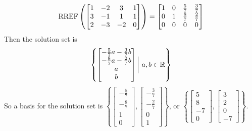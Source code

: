 \documentclass{sbgLAexam}
\begin{document}
\begin{solution}
$$\operatorname{RREF} \left(\begin{bmatrix} 1 & -2 & 3 & 1 \\ 3 & -1 & 1 & 1 \\ 2 & -3 & -2 & 0  \end{bmatrix} \right) = \begin{bmatrix} 1 & 0 & \frac{5}{7} & \frac{3}{7} \\ 0 & 1 & \frac{8}{7} & \frac{2}{7} \\ 0 & 0 & 0 & 0\end{bmatrix}$$
Then the solution set is
$$\left\{ \begin{bmatrix} -\frac{5}{7}a-\frac{3}{7}b \\ -\frac{8}{7}a-\frac{2}{7}b \\ a \\ b \end{bmatrix} \bigg |\ a,b \in \mathbb{R} \right\}$$
So a basis for the solution set is $\left\{\begin{bmatrix} -\frac{5}{7} \\ -\frac{8}{7} \\ 1 \\ 0\end{bmatrix}, \begin{bmatrix} - \frac{3}{7} \\ -\frac{2}{7} \\ 0 \\ 1 \end{bmatrix} \right\}$, or $\left\{\begin{bmatrix} 5 \\ 8 \\ -7 \\ 0 \end{bmatrix}, \begin{bmatrix} 3 \\ 2 \\ 0 \\ -7 \end{bmatrix}\right\}$.
\end{solution}
\end{document}
